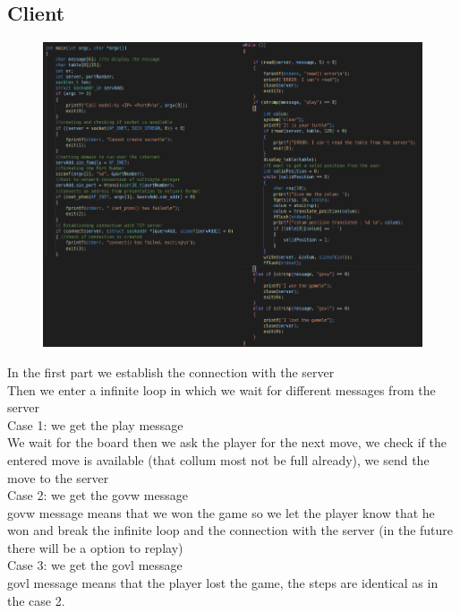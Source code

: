 \documentclass{article}
\begin{document}
\subsection{Client}
\begin{figure}[h!]
    \centering
    \includegraphics[width=1.3\textwidth,height=\textheight,keepaspectratio]{client_code.png}
\end{figure}
In the first part we establish the connection with the server\\
Then we enter a infinite loop in which we wait for different messages from the server
\\Case 1: we get the play message
\\We wait for the board then we ask the player for the next move, we check if the entered move is available (that collum most not be full already), we send the move to the server
\\Case 2: we get the govw message
\\govw message means that we won the game so we let the player know that he won and break the infinite loop and the connection with the server (in the future there will be a option to replay)
\\Case 3: we get the govl message
\\govl message means that the player lost the game, the steps are identical as in the case 2.
\end{document}
